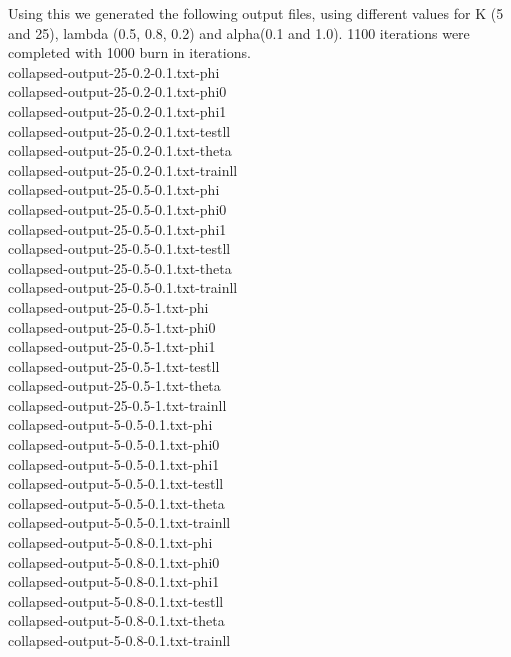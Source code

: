 \documentclass{article}
\begin{document}
Using this we generated the following output files, using different values for K (5 and 25), lambda (0.5, 0.8, 0.2)
and alpha(0.1 and 1.0). 1100 iterations were completed with 1000 burn in iterations.\\
collapsed-output-25-0.2-0.1.txt-phi\\
collapsed-output-25-0.2-0.1.txt-phi0\\
collapsed-output-25-0.2-0.1.txt-phi1\\
collapsed-output-25-0.2-0.1.txt-testll\\
collapsed-output-25-0.2-0.1.txt-theta\\
collapsed-output-25-0.2-0.1.txt-trainll\\
collapsed-output-25-0.5-0.1.txt-phi\\
collapsed-output-25-0.5-0.1.txt-phi0\\
collapsed-output-25-0.5-0.1.txt-phi1\\
collapsed-output-25-0.5-0.1.txt-testll\\
collapsed-output-25-0.5-0.1.txt-theta\\
collapsed-output-25-0.5-0.1.txt-trainll\\
collapsed-output-25-0.5-1.txt-phi\\
collapsed-output-25-0.5-1.txt-phi0\\
collapsed-output-25-0.5-1.txt-phi1\\
collapsed-output-25-0.5-1.txt-testll\\
collapsed-output-25-0.5-1.txt-theta\\
collapsed-output-25-0.5-1.txt-trainll\\
collapsed-output-5-0.5-0.1.txt-phi\\
collapsed-output-5-0.5-0.1.txt-phi0\\
collapsed-output-5-0.5-0.1.txt-phi1\\
collapsed-output-5-0.5-0.1.txt-testll\\
collapsed-output-5-0.5-0.1.txt-theta\\
collapsed-output-5-0.5-0.1.txt-trainll\\
collapsed-output-5-0.8-0.1.txt-phi\\
collapsed-output-5-0.8-0.1.txt-phi0\\
collapsed-output-5-0.8-0.1.txt-phi1\\
collapsed-output-5-0.8-0.1.txt-testll\\
collapsed-output-5-0.8-0.1.txt-theta\\
collapsed-output-5-0.8-0.1.txt-trainll\\
\end{document}
